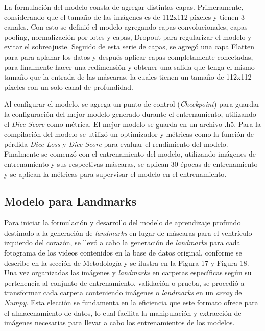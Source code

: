 \documentclass[runningheads]{llncs}
\begin{document}
La formulación del modelo consta de agregar distintas capas. Primeramente, considerando que el tamaño de las imágenes es de 112x112 píxeles y tienen 3 canales. Con esto se definió el modelo agregando capas convolucionales, capas pooling, normalización por lotes y capas, Dropout para regularizar el modelo \citep{srivastava2014dropout} y evitar el sobreajuste. Seguido de esta serie de capas, se agregó una capa Flatten para para aplanar los datos y después aplicar capas completamente conectadas, para finalmente hacer una redimensión y obtener una salida que tenga el mismo tamaño que la entrada de las máscaras, la cuales tienen un tamaño de 112x112 píxeles con un solo canal de profundidad. 

Al configurar el modelo, se agrega un punto de control (\textit{Checkpoint}) para guardar la configuración del mejor modelo generado durante el entrenamiento, utilizando el \textit{Dice Score} como métrica. El mejor modelo se guarda en un archivo .h5. Para la compilación del modelo se utilizó un optimizador y métricas como la función de pérdida \textit{Dice Loss} y \textit{Dice Score} para evaluar el rendimiento del modelo. Finalmente se comenzó con el entrenamiento del modelo, utilizando imágenes de entrenamiento y sus respectivas máscaras, se aplican 30 épocas de entrenamiento y se aplican la métricas para supervisar el modelo en el entrenamiento.

\subsection{Modelo para Landmarks} 

Para iniciar la formulación y desarrollo del modelo de aprendizaje profundo destinado a la generación de \textit{landmarks} en lugar de máscaras para el ventrículo izquierdo del corazón, se llevó a cabo la generación de \textit{landmarks} para cada fotograma de los videos contenidos en la base de datos original, conforme se describe en la sección de Metodología y se ilustra en la Figura 17 y Figura 18. Una vez organizadas las imágenes y \textit{landmarks} en carpetas específicas según su pertenencia al conjunto de entrenamiento, validación o prueba, se procedió a transformar cada carpeta conteniendo imágenes o \textit{landmarks} en un \textit{array} de \textit{Numpy}. Esta elección se fundamenta en la eficiencia que este formato ofrece para el almacenamiento de datos, lo cual facilita la manipulación y extracción de imágenes necesarias para llevar a cabo los entrenamientos de los modelos.
\end{document}
